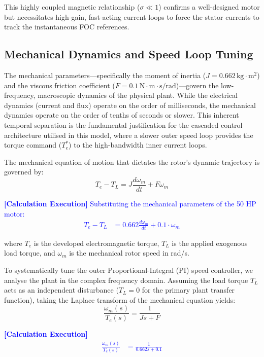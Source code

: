 \documentclass[12pt]{article}
\begin{document}
This highly coupled magnetic relationship ($\sigma \ll 1$) confirms a well-designed motor but necessitates high-gain, fast-acting current loops to force the stator currents to track the instantaneous FOC references.

\subsection{Mechanical Dynamics and Speed Loop Tuning}
The mechanical parameters—specifically the moment of inertia ($J = 0.662 \, \text{kg}\cdot\text{m}^2$) and the viscous friction coefficient ($F = 0.1 \, \text{N}\cdot\text{m}\cdot\text{s/rad}$)—govern the low-frequency, macroscopic dynamics of the physical plant. While the electrical dynamics (current and flux) operate on the order of milliseconds, the mechanical dynamics operate on the order of tenths of seconds or slower. This inherent temporal separation is the fundamental justification for the cascaded control architecture utilised in this model, where a slower outer speed loop provides the torque command ($T_e^*$) to the high-bandwidth inner current loops.

The mechanical equation of motion that dictates the rotor's dynamic trajectory is governed by:
\begin{equation}
    T_e - T_L = J \frac{d\omega_m}{dt} + F\omega_m
\end{equation}

    \textcolor{blue}{\textbf{[Calculation Execution]} Substituting the mechanical parameters of the 50 HP motor:
    \begin{align*}
        T_e - T_L &= 0.662 \frac{d\omega_m}{dt} + 0.1 \cdot \omega_m
    \end{align*}}

where $T_e$ is the developed electromagnetic torque, $T_L$ is the applied exogenous load torque, and $\omega_m$ is the mechanical rotor speed in rad/s. 

To systematically tune the outer Proportional-Integral (PI) speed controller, we analyse the plant in the complex frequency domain. Assuming the load torque $T_L$ acts as an independent disturbance ($T_L = 0$ for the primary plant transfer function), taking the Laplace transform of the mechanical equation yields:
\begin{equation}
    \frac{\omega_m(s)}{T_e(s)} = \frac{1}{Js + F}
\end{equation}

    \textcolor{blue}{\textbf{[Calculation Execution]} 
    \begin{align*}
        \frac{\omega_m(s)}{T_e(s)} &= \frac{1}{0.662s + 0.1}
    \end{align*}}
\end{document}
